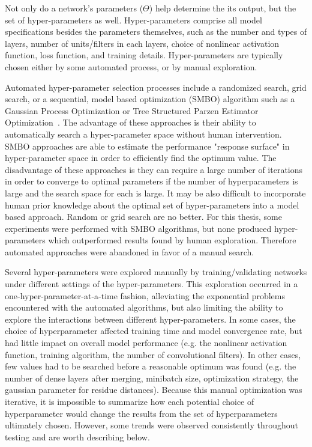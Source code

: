 Not only do a network's parameters ($\Theta$) help determine the its output, but the set of hyper-parameters as well.
Hyper-parameters comprise all model specifications besides the parameters themselves, such as the number and types of layers, number of units/filters in each layers, choice of nonlinear activation function, loss function, and training details.
Hyper-parameters are typically chosen either by some automated process, or by manual exploration.

Automated hyper-parameter selection processes include a randomized search, grid search, or a sequential, model based optimization (SMBO) algorithm such as a Gaussian Process Optimization or Tree Structured Parzen Estimator Optimization~\cite{bergstra2011}.
The advantage of these approaches is their ability to automatically search a hyper-parameter space without human intervention. 
SMBO approaches are able to estimate the performance "response surface" in hyper-parameter space in order to efficiently find the optimum value.
The disadvantage of these approaches is they can require a large number of iterations in order to converge to optimal parameters if the number of hyperparameters is large and the search space for each is large. 
It may be also difficult to incorporate human prior knowledge about the optimal set of hyper-parameters into a model based approach.
Random or grid search are no better.
For this thesis, some experiments were performed with SMBO algorithms, but none produced hyper-parameters which outperformed results found by human exploration.
Therefore automated approaches were abandoned in favor of a manual search.

Several hyper-parameters were explored manually by training/validating networks under different settings of the hyper-parameters.
This exploration occurred in a one-hyper-parameter-at-a-time fashion, alleviating the exponential problems encountered with the automated algorithms, but also limiting the ability to explore the interactions between different hyper-parameters.
In some cases, the choice of hyperparameter affected training time and model convergence rate, but had little impact on overall model performance (e.g. the nonlinear activation function, training algorithm, the number of convolutional filters).
In other cases, few values had to be searched before a reasonable optimum was found (e.g. the number of dense layers after merging, minibatch size, optimization strategy, the gaussian parameter for residue distances).
Because this manual optimization was iterative, it is impossible to summarize how each potential choice of hyperparameter would change the results from the set of hyperparameters ultimately chosen.
However, some trends were observed consistently throughout testing and are worth describing below.

